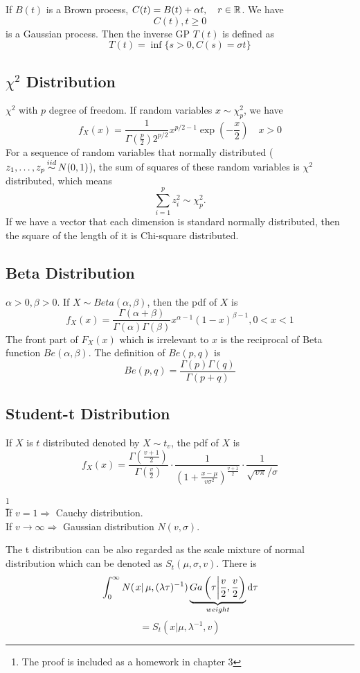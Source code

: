 		
		If $B(t)$ is a Brown process, $C(t) = B(t)+\alpha t,\quad r\in \mathbb{R}$. We have 
		$${C(t),t\geq0}$$
		is a Gaussian process. Then the inverse GP $T(t)$ is defined as
		$$T(t) = \inf\{s>0, C(s)=\sigma t\}$$
		
	\subsection{$\chi^2$ Distribution}
	$\chi^2$ with $p$ degree of freedom. If random variables $x\sim \chi^2_p$, we have
	$$f_X(x) = \frac{1}{\Gamma\left(\frac{p}{2}\right)2^{p/2}}x^{p/2-1}\exp\left(-\frac{x}{2}\right) \quad x>0$$ 
	For a sequence of random variables that normally distributed ($z_1,\dots,z_p \iidsim N(0,1)$), the sum of squares of these random variables is $\chi^2$ distributed, which means
	 $$\sum\limits_{i=1}^{p}z_i^2\sim \chi_p^2.$$ If we have a vector that each dimension is standard normally distributed, then the square of the length of it is Chi-square distributed.
	
	\subsection{Beta Distribution}
	$\alpha>0, \beta>0$. If $X\sim Beta(\alpha , \beta)$, then the pdf of $X$ is
	$$f_X(x)=\frac{\Gamma(\alpha+\beta)}{\Gamma(\alpha)\Gamma(\beta)}x^{\alpha-1}(1-x)^{\beta-1}, 0<x<1$$ 
	The front part of $F_X(x)$ which is irrelevant to $x$ is the reciprocal of Beta function $Be(\alpha, \beta)$. The definition of $Be(p, q)$ is 
	$$Be(p,q)=\frac{\Gamma(p)\Gamma(q)}{\Gamma(p+q)}$$
	
	\subsection{Student-t Distribution}
	If $X$ is $t$ distributed denoted by $X\sim t_v$, the pdf of $X$ is 
	$$f_X(x)=\frac{\Gamma\left( \frac{v+1}{2}\right)}{\Gamma\left(\frac{v}{2}\right)}\cdot \frac{1}{\left(1+\frac{x-\mu}{v\sigma^2}\right)^{\frac{v+1}{2}}}\cdot \frac{1}{\sqrt{v\pi}/\sigma}$$
	
	\begin{theorem}\footnote{The proof is included as a homework in chapter 3}\\
		If $v=1 \Rightarrow$ Cauchy distribution.\\
		If $v\to \infty \Rightarrow$ Gaussian distribution $N(v, \sigma)$.
	\end{theorem}
	
	The t distribution can be also regarded as the scale mixture of normal distribution which can be denoted as $S_t(\mu, \sigma, v)$. There is 
	$$
	\int_{0}^{\infty}N(\left.x\right| \mu, (\lambda\tau)^{-1})\underbrace{Ga\left(\tau \bigg|\frac{v}{2},\frac{v}{2}\right)}_{weight}\mathrm{d} \tau$$
	$$= S_t\left(x|\mu, \lambda^{-1},v\right)$$
	
